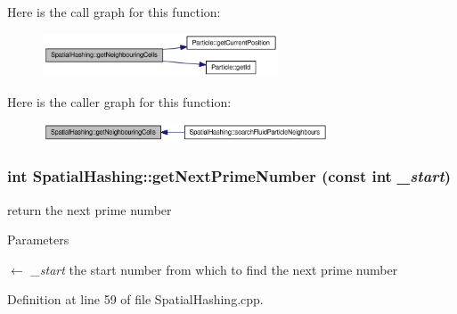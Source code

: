 Here is the call graph for this function:\nopagebreak
\begin{figure}[H]
\begin{center}
\leavevmode
\includegraphics[width=198pt]{class_spatial_hashing_ad75a31f38142a1c2a03eda6afed94db3_cgraph}
\end{center}
\end{figure}




Here is the caller graph for this function:\nopagebreak
\begin{figure}[H]
\begin{center}
\leavevmode
\includegraphics[width=240pt]{class_spatial_hashing_ad75a31f38142a1c2a03eda6afed94db3_icgraph}
\end{center}
\end{figure}


\hypertarget{class_spatial_hashing_ab9a10a48fe163699f3e35e36d310254d}{
\subsubsection[{getNextPrimeNumber}]{\setlength{\rightskip}{0pt plus 5cm}int SpatialHashing::getNextPrimeNumber (const int {\em \_\-start})}}
\label{class_spatial_hashing_ab9a10a48fe163699f3e35e36d310254d}


return the next prime number 


\begin{DoxyParams}{Parameters}
\item[\mbox{$\leftarrow$} {\em \_\-start}]the start number from which to find the next prime number \end{DoxyParams}


Definition at line 59 of file SpatialHashing.cpp.




